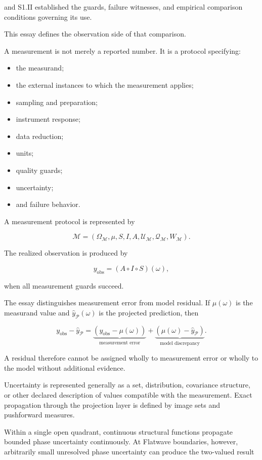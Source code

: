 \documentclass[11pt,oneside,openany]{book}
\begin{document}
and S1.II established the guards, failure witnesses, and empirical comparison conditions governing its use.

This essay defines the observation side of that comparison.

A measurement is not merely a reported number. It is a protocol specifying:

\begin{itemize}
\item the measurand;
\item the external instances to which the measurement applies;
\item sampling and preparation;
\item instrument response;
\item data reduction;
\item units;
\item quality guards;
\item uncertainty;
\item and failure behavior.
\end{itemize}
A measurement protocol is represented by

\[
\mathcal M = \left( \Omega_{\mathcal M}, \mu, S, I, A, \mathcal U_{\mathcal M}, \mathcal Q_{\mathcal M}, W_{\mathcal M} \right).
\]

The realized observation is produced by

\[
y_{\mathrm{obs}} = (A\circ I\circ S)(\omega),
\]

when all measurement guards succeed.

The essay distinguishes measurement error from model residual. If \(\mu(\omega)\) is the measurand value and \(\widehat y_{\mathcal P}(\omega)\) is the projected prediction, then

\[
y_{\mathrm{obs}} - \widehat y_{\mathcal P} = \underbrace{ \left( y_{\mathrm{obs}}-\mu(\omega) \right) }_{\text{measurement error}} + \underbrace{ \left( \mu(\omega)-\widehat y_{\mathcal P} \right) }_{\text{model discrepancy}}.
\]

A residual therefore cannot be assigned wholly to measurement error or wholly to the model without additional evidence.

Uncertainty is represented generally as a set, distribution, covariance structure, or other declared description of values compatible with the measurement. Exact propagation through the projection layer is defined by image sets and pushforward measures.

Within a single open quadrant, continuous structural functions propagate bounded phase uncertainty continuously. At Flatwave boundaries, however, arbitrarily small unresolved phase uncertainty can produce the two-valued result
\end{document}
